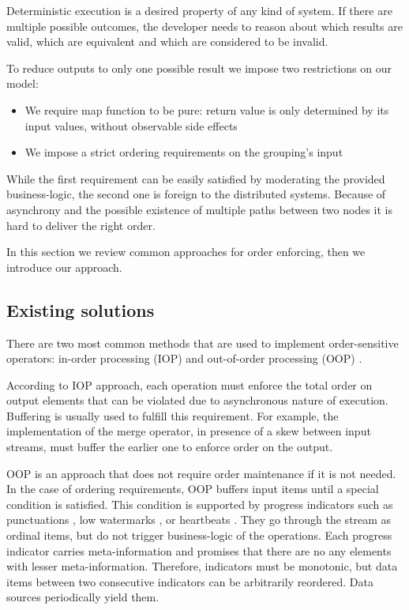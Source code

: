 \label {fs-collision}

Deterministic execution is a desired property of any kind of system. If there are multiple possible outcomes, the developer needs to reason about which results are valid, which are equivalent and which are considered to be invalid.

To reduce outputs to only one possible result we impose two restrictions on our model: 

\begin{itemize}
  \item We require map function to be pure: return value is only determined by its input values, without observable side effects
  \item We impose a strict ordering requirements on the grouping's input
\end{itemize}

While the first requirement can be easily satisfied by moderating the provided business-logic, the second one is foreign to the distributed systems. Because of asynchrony and the possible existence of multiple paths between two nodes it is hard to deliver the right order. 

In this section we review common approaches for order enforcing, then we introduce our approach.

\subsection{Existing solutions}

There are two most common methods that are used to implement order-sensitive operators: in-order processing (IOP) \cite{Arasu:2006:CCQ:1146461.1146463, Cranor:2003:GSD:872757.872838, hammad2004optimizing} and out-of-order processing (OOP) \cite{Li:2008:OPN:1453856.1453890}.

According to IOP approach, each operation must enforce the total order on output elements that can be violated due to asynchronous nature of execution. Buffering is usually used to fulfill this requirement. For example, the implementation of the merge operator, in presence of a skew between input streams, must buffer the earlier one to enforce order on the output.

OOP is an approach that does not require order maintenance if it is not needed. In the case of ordering requirements, OOP buffers input items until a special condition is satisfied. This condition is supported by progress indicators such as punctuations \cite{Tucker:2003:EPS:776752.776780}, low watermarks \cite{Akidau:2013:MFS:2536222.2536229}, or heartbeats \cite{Srivastava:2004:FTM:1055558.1055596}. They go through the stream as ordinal items, but do not trigger business-logic of the operations. Each progress indicator carries meta-information and promises that there are no any elements with lesser meta-information. Therefore, indicators must be monotonic, but data items between two consecutive indicators can be arbitrarily reordered. Data sources periodically yield them.

